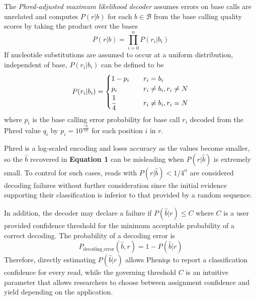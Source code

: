 \documentclass[10pt,twocolumn]{article}
\begin{document}
The \emph{Phred-adjusted maximum likelihood decoder} assumes errors on base calls are unrelated and computes $P(r|b)$ for each $b \in \mathcal{B}$ from the base calling quality scores by taking the product over the bases \citep{EA884454-5858-46F9-85F9-77FA53B1AC66}
%
\begin{equation}
P(r|b) = \prod_{i=0}^n P(r_{i}|b_{i})
\end{equation}
%
If nucleotide substitutions are assumed to occur at a uniform distribution, independent of base, $P(r_{i}|b_{i})$ can be defined to be
%
\begin{equation}
P(r_{i}|b_{i}) = \begin{cases} 1 - p_{i} & \quad {r_{i} = b_{i}}\\ p_{i} & \quad {r_{i} \ne b_{i}, r_{i} \ne N}\\ \cfrac{1}{4} & \quad {r_{i} \ne b_{i}, {r_{i} = N}}\\ \end{cases}
\end{equation}
%
where $p_{i}$ is the base calling error probability for base call $r_{i}$ decoded from the Phred value $q_{i}$ by $p_{i} = 10^{\frac{-q_{i}}{10}}$ for each position $i$ in $r$.

Phred is a log-scaled encoding and loses accuracy as the values become smaller, so the $\hat{b}$ recovered in \textbf{Equation 1} can be misleading when $P(r|\hat{b})$ is extremely small. To control for such cases,
reads with $P(r|\hat{b}) < 1/4^n$ are considered decoding failures without further consideration since the initial evidence supporting their classification is inferior to that provided by a random sequence.

In addition, the decoder may declare a failure if $P(\hat{b}|r) \leq C$ where $C$ is a user provided confidence threshold for the minimum acceptable probability of a correct decoding. The probability of a decoding error is
%
\begin{equation}
P_{\text{decoding\_error}}(\hat{b}, r) = 1 - P(\hat{b}|r)
\end{equation}
%
 Therefore, directly estimating $P(\hat{b}|r)$ allows Pheniqs to report a classification confidence for every read, while the governing threshold $C$ is an intuitive parameter that allows researchers to choose between assignment confidence and yield depending on the application.
\end{document}

